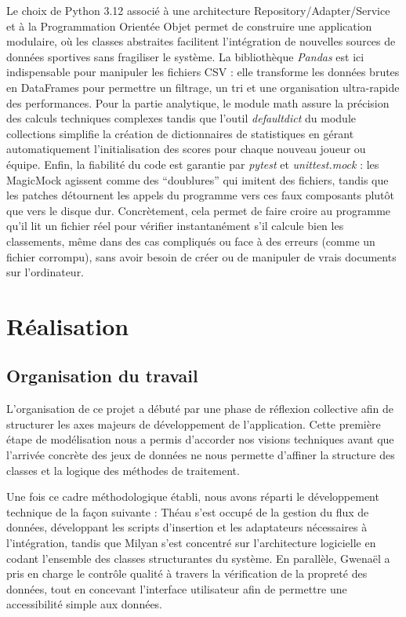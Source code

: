 \documentclass[
  french,
  letterpaper,
  DIV=11,
  numbers=noendperiod]{scrartcl}
\begin{document}
Le choix de Python 3.12 associé à une architecture
Repository/Adapter/Service et à la Programmation Orientée Objet permet
de construire une application modulaire, où les classes abstraites
facilitent l'intégration de nouvelles sources de données sportives sans
fragiliser le système. La bibliothèque \emph{Pandas} est ici
indispensable pour manipuler les fichiers CSV : elle transforme les
données brutes en DataFrames pour permettre un filtrage, un tri et une
organisation ultra-rapide des performances. Pour la partie analytique,
le module math assure la précision des calculs techniques complexes
tandis que l'outil \emph{defaultdict} du module collections simplifie la
création de dictionnaires de statistiques en gérant automatiquement
l'initialisation des scores pour chaque nouveau joueur ou équipe. Enfin,
la fiabilité du code est garantie par \emph{pytest} et
\emph{unittest.mock} : les MagicMock agissent comme des ``doublures''
qui imitent des fichiers, tandis que les patches détournent les appels
du programme vers ces faux composants plutôt que vers le disque dur.
Concrètement, cela permet de faire croire au programme qu'il lit un
fichier réel pour vérifier instantanément s'il calcule bien les
classements, même dans des cas compliqués ou face à des erreurs (comme
un fichier corrompu), sans avoir besoin de créer ou de manipuler de
vrais documents sur l'ordinateur.

\section{Réalisation}\label{ruxe9alisation}

\subsection{Organisation du travail}\label{organisation-du-travail}

L'organisation de ce projet a débuté par une phase de réflexion
collective afin de structurer les axes majeurs de développement de
l'application. Cette première étape de modélisation nous a permis
d'accorder nos visions techniques avant que l'arrivée concrète des jeux
de données ne nous permette d'affiner la structure des classes et la
logique des méthodes de traitement.

Une fois ce cadre méthodologique établi, nous avons réparti le
développement technique de la façon suivante : Théau s'est occupé de la
gestion du flux de données, développant les scripts d'insertion et les
adaptateurs nécessaires à l'intégration, tandis que Milyan s'est
concentré sur l'architecture logicielle en codant l'ensemble des classes
structurantes du système. En parallèle, Gwenaël a pris en charge le
contrôle qualité à travers la vérification de la propreté des données,
tout en concevant l'interface utilisateur afin de permettre une
accessibilité simple aux données.
\end{document}
